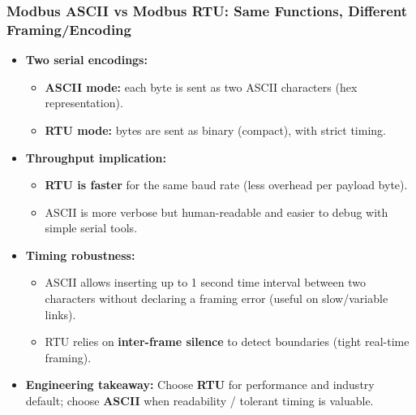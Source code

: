 \begin{frame}
	\frametitle{Modbus ASCII vs Modbus RTU: Same Functions, Different Framing/Encoding}
	\begin{itemize}
		\item \textbf{Two serial encodings:}
		\begin{itemize}
			\item \textbf{ASCII mode:} each byte is sent as \alert{two ASCII characters} (hex representation).
			\item \textbf{RTU mode:} bytes are sent as \alert{binary} (compact), with strict timing.
		\end{itemize}
		\item \textbf{Throughput implication:}
		\begin{itemize}
			\item \textbf{RTU is faster} for the same baud rate (less overhead per payload byte).
			\item ASCII is more verbose but human-readable and easier to debug with simple serial tools.
		\end{itemize}
		\item \textbf{Timing robustness:}
		\begin{itemize}
			\item ASCII allows inserting up to \alert{1 second} time interval between two characters
				without declaring a framing error (useful on slow/variable links).
			\item RTU relies on \textbf{inter-frame silence} to detect boundaries (tight real-time framing).
		\end{itemize}
		\item \textbf{Engineering takeaway:} Choose \textbf{RTU} for performance and industry default;
			choose \textbf{ASCII} when readability / tolerant timing is valuable.
	\end{itemize}
\end{frame}


